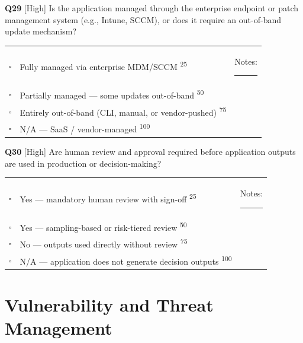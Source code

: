 \documentclass[11pt,landscape]{article}
\begin{document}
\vspace{0.3cm}

\noindent\colorbox{highbg}{\textbf{Q29} [High]} Is the application managed through the enterprise endpoint or patch management system (e.g., Intune, SCCM), or does it require an out-of-band update mechanism?

\begin{tabularx}{\textwidth}{cXX}
$\square$ & Fully managed via enterprise MDM/SCCM \textsuperscript{\scriptsize\textcolor{stridegray}{25}} & Notes: \rule{4cm}{0.4pt} \\
$\square$ & Partially managed --- some updates out-of-band \textsuperscript{\scriptsize\textcolor{stridegray}{50}} &  \\
$\square$ & Entirely out-of-band (CLI, manual, or vendor-pushed) \textsuperscript{\scriptsize\textcolor{stridegray}{75}} &  \\
$\square$ & N/A --- SaaS / vendor-managed \textsuperscript{\scriptsize\textcolor{stridegray}{100}} &  \\
\end{tabularx}

\vspace{0.3cm}

\noindent\colorbox{highbg}{\textbf{Q30} [High]} Are human review and approval required before application outputs are used in production or decision-making?

\begin{tabularx}{\textwidth}{cXX}
$\square$ & Yes --- mandatory human review with sign-off \textsuperscript{\scriptsize\textcolor{stridegray}{25}} & Notes: \rule{4cm}{0.4pt} \\
$\square$ & Yes --- sampling-based or risk-tiered review \textsuperscript{\scriptsize\textcolor{stridegray}{50}} &  \\
$\square$ & No --- outputs used directly without review \textsuperscript{\scriptsize\textcolor{stridegray}{75}} &  \\
$\square$ & N/A --- application does not generate decision outputs \textsuperscript{\scriptsize\textcolor{stridegray}{100}} &  \\
\end{tabularx}

\vspace{0.3cm}

\newpage

\section{Vulnerability and Threat Management}
\end{document}
